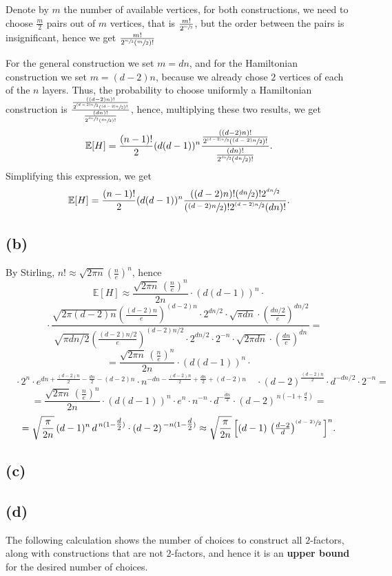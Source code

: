\documentclass{article}
\begin{document}
Denote by $m$ the number of available vertices, for both constructions, we need to choose $\frac{m}{2}$ pairs out of $m$ vertices, that is $\frac{m!}{2^{\sfrac{m}{2}}}$, but the order between the pairs is insignificant, hence we get $\frac{m!}{2^{\sfrac{m}{2}}(\sfrac{m}{2})!}$

For the general construction we set $m=dn$, and for the Hamiltonian construction we set $m=(d-2)n$, because we already chose $2$ vertices of each of the $n$ layers. Thus, the probability to choose uniformly a Hamiltonian construction is $\frac{\frac{((d-2)n)!}{2^{\sfrac{(d-2)n}{2}}(\sfrac{(d-2)n}{2})!}}{\frac{(dn)!}{2^{\sfrac{dn}{2}}(\sfrac{dn}{2})!}}$, hence, multiplying these two results, we get \[
\mathbb{E}[H]=\frac{(n-1)!}{2}(d(d-1))^n\frac{\frac{((d-2)n)!}{2^{\sfrac{(d-2)n}{2}}(\sfrac{(d-2)n}{2})!}}{\frac{(dn)!}{2^{\sfrac{dn}{2}}(\sfrac{dn}{2})!}}
.\]
Simplifying this expression, we get
\[
\mathbb{E}[H]=\frac{(n-1)!}{2}(d(d-1))^n\frac{((d-2)n)!(\sfrac{dn}{2})!2^{\sfrac{dn}{2}}}{(\sfrac{(d-2)n}{2})!2^{\sfrac{(d-2)n}{2}}(dn)!}
.\]
\subsection*{(b)}
By Stirling, $n!\approx\sqrt{2\pi{n}}(\frac{n}{e})^n$, hence 
\[\mathbb{E}[H]\approx\frac{\sqrt{2\pi n}\,\left(\tfrac{n}{e}\right)^n}{2n}
\cdot(d(d-1))^n\cdot\]\[
\quad\cdot\frac{\sqrt{2\pi{(d-2)n}}\left(\tfrac{(d-2)n}{e}\right)^{(d-2)n}\cdot{2^{dn/2}}\cdot\sqrt{\pi dn}\cdot\left(\tfrac{dn/2}{e}\right)^{dn/2}}
         {\sqrt{\pi dn/2}\left(\tfrac{(d-2)n/2}{e}\right)^{(d-2)n/2}\cdot 2^{dn/2}\cdot2^{-n}\cdot\sqrt{2\pi dn}\cdot\left(\tfrac{dn}{e}\right)^{dn}}
=\]\[=\frac{\sqrt{2\pi{n}}\,\left(\tfrac{n}{e}\right)^n}{2n}\cdot(d(d-1))^n\cdot\]
\[\quad\cdot2^n\cdot e^{dn+\tfrac{(d-2)n}{2}-\tfrac{dn}{2}-(d-2)n}\cdot{n}^{-dn- \tfrac{(d-2)n}{2}+\tfrac{dn}{2}+(d-2)n}
\quad\cdot(d-2)^{\tfrac{(d-2)n}{2}} \cdot{d}^{-dn/2}\cdot{2^{-n}}
=\]\[=\frac{\sqrt{2\pi n}\,\left(\tfrac{n}{e}\right)^n}{2n}\cdot(d(d-1))^n\cdot{e^n} \cdot{n^{-n}}
    \cdot{d}^{-\tfrac{dn}{2}}\cdot(d-2)^{\,n(-1+\tfrac{d}{2})}
=\]\[=\sqrt{\frac{\pi}{2n}}\,(d-1)^n\,d^{\,n(1-\tfrac{d}{2})}\cdot(d-2)^{\,-n(1-\tfrac{d}{2})}
\approx\sqrt{\frac{\pi}{2n}}\,\Big[(d-1)\,\left(\tfrac{d-2}{d}\right)^{\sfrac{(d-2)}{2}}\Big]^n.\]
\subsection*{(c)}
\subsection*{(d)}
The following calculation shows the number of choices to construct all $2$-factors, along with constructions that are not $2$-factors, and hence it is an \textbf{upper bound} for the desired number of choices.
\end{document}
